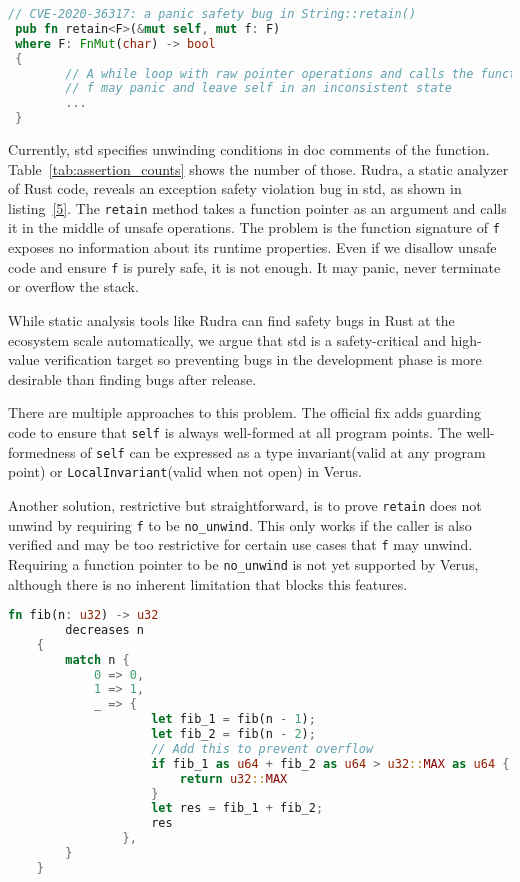 \documentclass[conference]{IEEEtran}
\begin{document}
\begin{lstlisting}[language=Rust,style=colouredRust, caption={An example of exception safety violation}, label = {5}]
// CVE-2020-36317: a panic safety bug in String::retain()
 pub fn retain<F>(&mut self, mut f: F)
 where F: FnMut(char) -> bool
 {
        // A while loop with raw pointer operations and calls the function f
        // f may panic and leave self in an inconsistent state
        ...
 }
\end{lstlisting}

Currently, std specifies unwinding conditions in doc comments of the function. Table~\ref{tab:assertion_counts} shows the number of those. Rudra\cite{Rudra}, a static analyzer of Rust code, reveals an exception safety violation bug\cite{CVE-2020-36317} in std, as shown in listing~\ref{5}. The \texttt{retain} method takes a function pointer as an argument and calls it in the middle of unsafe operations. The problem is the function signature of \texttt{f} exposes no information about its runtime properties. Even if we disallow unsafe code and ensure \texttt{f} is purely safe, it is not enough. It may panic, never terminate or overflow the stack. 

While static analysis tools like Rudra can find safety bugs in Rust at the ecosystem scale automatically, we argue that std is a safety-critical and high-value verification target so preventing bugs in the development phase is more desirable than finding bugs after release. 

There are multiple approaches to this problem. The official fix adds guarding code to ensure that \texttt{self} is always well-formed at all program points. The well-formedness of \texttt{self} can be expressed as a type invariant(valid at any program point) or \texttt{LocalInvariant}(valid when not open) in Verus. 

Another solution, restrictive but straightforward, is to prove \texttt{retain} does not unwind by requiring \texttt{f} to be \texttt{no\_unwind}. This only works if the caller is also verified and may be too restrictive for certain use cases that \texttt{f} may unwind. Requiring a function pointer to be \texttt{no\_unwind} is not yet supported by Verus, although there is no inherent limitation that blocks this features.   

\begin{lstlisting}[language=Rust,style=colouredRust, caption={decreases example}, label = {6}]
    fn fib(n: u32) -> u32 
        decreases n 
    {
        match n {
            0 => 0,
            1 => 1,
            _ => {
                    let fib_1 = fib(n - 1); 
                    let fib_2 = fib(n - 2);
                    // Add this to prevent overflow
                    if fib_1 as u64 + fib_2 as u64 > u32::MAX as u64 {
                        return u32::MAX
                    }
                    let res = fib_1 + fib_2;
                    res
                },
        }
    }
\end{lstlisting}
\end{document}
